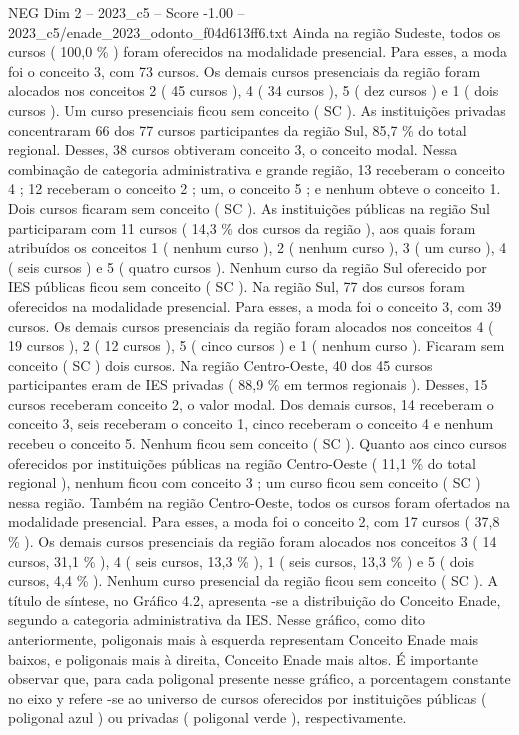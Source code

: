 \begin{textsample}{NEG Dim 2 – 2023\_c5 – Score -1.00 – 2023\_c5/enade\_2023\_odonto\_f04d613ff6.txt}
Ainda na região Sudeste, todos os cursos ( 100,0 \% ) foram oferecidos na modalidade presencial.
Para esses, a moda foi o conceito 3, com 73 cursos.
Os demais cursos presenciais da região foram alocados nos conceitos 2 ( 45 cursos ), 4 ( 34 cursos ), 5 ( dez cursos ) e 1 ( dois cursos ).
Um curso presenciais ficou sem conceito ( SC ).
As instituições privadas concentraram 66 dos 77 cursos participantes da região Sul, 85,7 \% do total regional.
Desses, 38 cursos obtiveram conceito 3, o conceito modal.
Nessa combinação de categoria administrativa e grande região, 13 receberam o conceito 4 ; 12 receberam o conceito 2 ; um, o conceito 5 ; e nenhum obteve o conceito 1.
Dois cursos ficaram sem conceito ( SC ).
As instituições públicas na região Sul participaram com 11 cursos ( 14,3 \% dos cursos da região ), aos quais foram atribuídos os conceitos 1 ( nenhum curso ), 2 ( nenhum curso ), 3 ( um curso ), 4 ( seis cursos ) e 5 ( quatro cursos ).
Nenhum curso da região Sul oferecido por IES públicas ficou sem conceito ( SC ).
Na região Sul, 77 dos cursos foram oferecidos na modalidade presencial.
Para esses, a moda foi o conceito 3, com 39 cursos.
Os demais cursos presenciais da região foram alocados nos conceitos 4 ( 19 cursos ), 2 ( 12 cursos ), 5 ( cinco cursos ) e 1 ( nenhum curso ).
Ficaram sem conceito ( SC ) dois cursos.
Na região Centro-Oeste, 40 dos 45 cursos participantes eram de IES privadas ( 88,9 \% em termos regionais ).
Desses, 15 cursos receberam conceito 2, o valor modal.
Dos demais cursos, 14 receberam o conceito 3, seis receberam o conceito 1, cinco receberam o conceito 4 e nenhum recebeu o conceito 5.
Nenhum ficou sem conceito ( SC ).
Quanto aos cinco cursos oferecidos por instituições públicas na região Centro-Oeste ( 11,1 \% do total regional ), nenhum ficou com conceito 3 ; um curso ficou sem conceito ( SC ) nessa região.
Também na região Centro-Oeste, todos os cursos foram ofertados na modalidade presencial.
Para esses, a moda foi o conceito 2, com 17 cursos ( 37,8 \% ).
Os demais cursos presenciais da região foram alocados nos conceitos 3 ( 14 cursos, 31,1 \% ), 4 ( seis cursos, 13,3 \% ), 1 ( seis cursos, 13,3 \% ) e 5 ( dois cursos, 4,4 \% ).
Nenhum curso presencial da região ficou sem conceito ( SC ).
A título de síntese, no Gráfico 4.2, apresenta -se a distribuição do Conceito Enade, segundo a categoria administrativa da IES.
Nesse gráfico, como dito anteriormente, poligonais mais à esquerda representam Conceito Enade mais baixos, e poligonais mais à direita, Conceito Enade mais altos.
É importante observar que, para cada poligonal presente nesse gráfico, a porcentagem constante no eixo y refere -se ao universo de cursos oferecidos por instituições públicas ( poligonal azul ) ou privadas ( poligonal verde ), respectivamente.

\end{textsample}
